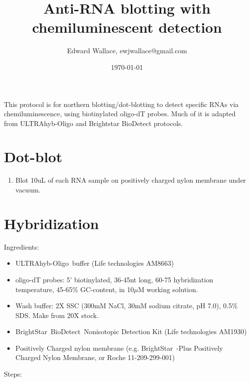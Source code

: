 \documentclass{article}
\newcommand{\muM}{\ensuremath{\mu}M\xspace}
\newcommand{\degC}{\celsius\xspace}
\begin{document}
\title{\vspace{-.75in} Anti-RNA blotting with chemiluminescent detection}
\author{Edward Wallace, ewjwallace@gmail.com}
\date{\today}
\maketitle


This protocol is for northern blotting/dot-blotting to detect specific RNAs via chemiluminescence, using biotinylated oligo-dT probes.
Much of it is adapted from ULTRAhyb-Oligo and Brightstar BioDetect protocols.


\section*{Dot-blot}

\begin{enumerate}[resume]
\item Blot 10uL of each RNA sample on positively charged nylon membrane under vacuum.
\end{enumerate}

\section*{Hybridization}

Ingredients:

\begin{itemize}
\item ULTRAhyb-Oligo\textregistered\ buffer (Life technologies AM8663)
\item oligo-dT probes: 5' biotinylated, 36-45nt long, 60-75\degC hybridization temperature, 45-65\% GC-content, in 10\muM working solution.
\item Wash buffer: 2X SSC (300mM NaCl, 30mM sodium citrate, pH 7.0), 0.5\% SDS. Make from 20X stock. %
  \item BrightStar\textregistered\ BioDetect\texttrademark\ Nonisotopic Detection Kit (Life technologies AM1930)
  \item Positively Charged nylon membrane (e.g. BrightStar\texttrademark\ -Plus Positively Charged Nylon Membrane, or Roche 11-209-299-001)
\end{itemize}

Steps:
\end{document}
